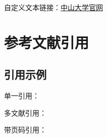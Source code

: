 \documentclass[12pt]{ctexart}
\begin{document}
\begin{sloppypar}
自定义文本链接：\href{https://www.sysu.edu.cn}{中山大学官网}

\section{参考文献引用}
\subsection{引用示例}
单一引用：\cite{knuth1986texbook}

多文献引用：\cite{vaswani2017attention,brown2020language}

带页码引用：\cite[pp. 45-47]{wang2010zhongwen}


\newpage



\end{sloppypar}
\end{document}
